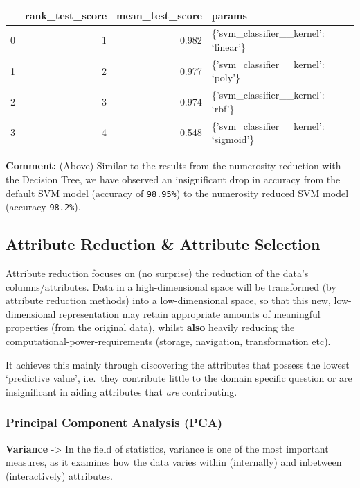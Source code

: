 \documentclass[11pt]{article}
\begin{document}
    \begin{longtable}[]{@{}rrrl@{}}
\toprule
& rank\_test\_score & mean\_test\_score & params\tabularnewline
\midrule
\endhead
0 & 1 & 0.982 & \{'svm\_classifier\_\_kernel': `linear'\}\tabularnewline
1 & 2 & 0.977 & \{'svm\_classifier\_\_kernel': `poly'\}\tabularnewline
2 & 3 & 0.974 & \{'svm\_classifier\_\_kernel': `rbf'\}\tabularnewline
3 & 4 & 0.548 & \{'svm\_classifier\_\_kernel':
`sigmoid'\}\tabularnewline
\bottomrule
\end{longtable}

    
    \textbf{Comment:} (Above) Similar to the results from the numerosity
reduction with the Decision Tree, we have observed an insignificant drop
in accuracy from the default SVM model (accuracy of \texttt{98.95\%}) to
the numerosity reduced SVM model (accuracy \texttt{98.2\%}).

    \hypertarget{attribute-reduction-attribute-selection}{%
\subsection{Attribute Reduction \& Attribute
Selection}\label{attribute-reduction-attribute-selection}}

Attribute reduction focuses on (no surprise) the reduction of the data's
columns/attributes. Data in a high-dimensional space will be transformed
(by attribute reduction methods) into a low-dimensional space, so that
this new, low-dimensional representation may retain appropriate amounts
of meaningful properties (from the original data), whilst \textbf{also}
heavily reducing the computational-power-requirements (storage,
navigation, transformation etc).

It achieves this mainly through discovering the attributes that possess
the lowest `predictive value', i.e.~they contribute little to the domain
specific question or are insignificant in aiding attributes that
\emph{are} contributing.

    \hypertarget{principal-component-analysis-pca}{%
\subsubsection{Principal Component Analysis
(PCA)}\label{principal-component-analysis-pca}}

\textbf{Variance} -\textgreater{} In the field of statistics, variance
is one of the most important measures, as it examines how the data
varies within (internally) and inbetween (interactively) attributes.
\end{document}
